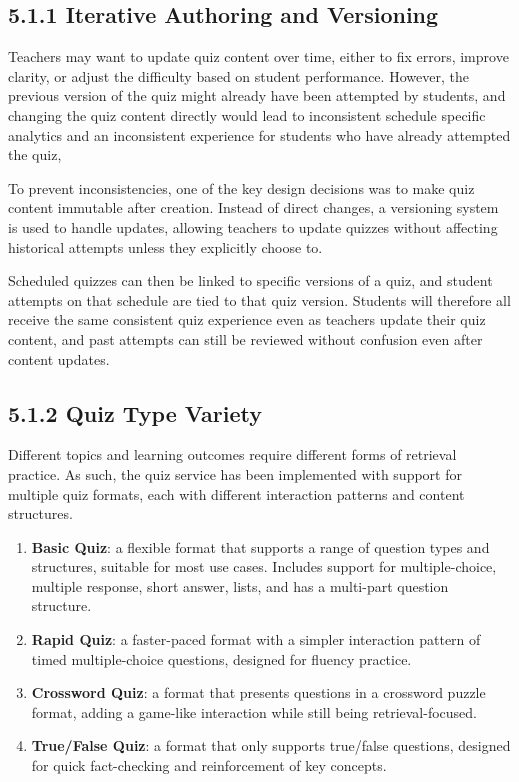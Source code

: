 \documentclass[
  12pt,
  a4paper,
]{report}
\begin{document}
\hypertarget{iterative-authoring-and-versioning}{%
\subsection{5.1.1 Iterative Authoring and Versioning}\label{iterative-authoring-and-versioning}}

Teachers may want to update quiz content over time, either to fix errors,
improve clarity, or adjust the difficulty based on student performance.
However, the previous version of the quiz might already have been
attempted by students, and changing the quiz content directly would lead
to inconsistent schedule specific analytics and an inconsistent experience for students who have already attempted the quiz,


To prevent inconsistencies, one of the key design decisions was to make
quiz content immutable after creation.
Instead of direct changes, a versioning system is used to handle updates, allowing teachers to update quizzes
without affecting historical attempts unless they explicitly choose to.

Scheduled quizzes can then be linked to specific versions of a quiz,
and student attempts on that schedule are tied to that quiz version. Students will
therefore all receive the same consistent quiz experience even as teachers
update their quiz content, and past attempts can still be reviewed
without confusion even after content updates.

\hypertarget{basic-quiz}{%
\subsection{5.1.2 Quiz Type Variety}\label{basic-quiz}}

Different topics and learning outcomes require different forms of
retrieval practice. As such, the quiz service has been implemented with
support for multiple quiz formats, each with different interaction
patterns and content structures.

\begin{enumerate}
  \item \textbf{Basic Quiz}: a flexible format that supports a range of question types and structures, suitable for most use cases. Includes support for
  multiple-choice, multiple response, short answer, lists, and has a multi-part question structure.
  \item \textbf{Rapid Quiz}: a faster-paced format with a simpler interaction pattern of timed multiple-choice questions, designed for fluency practice.
  \item \textbf{Crossword Quiz}: a format that presents questions in a crossword puzzle format, adding a game-like interaction while still being retrieval-focused.
  \item \textbf{True/False Quiz}: a format that only supports true/false questions, designed for quick fact-checking and reinforcement of key concepts.
\end{enumerate}
\end{document}
